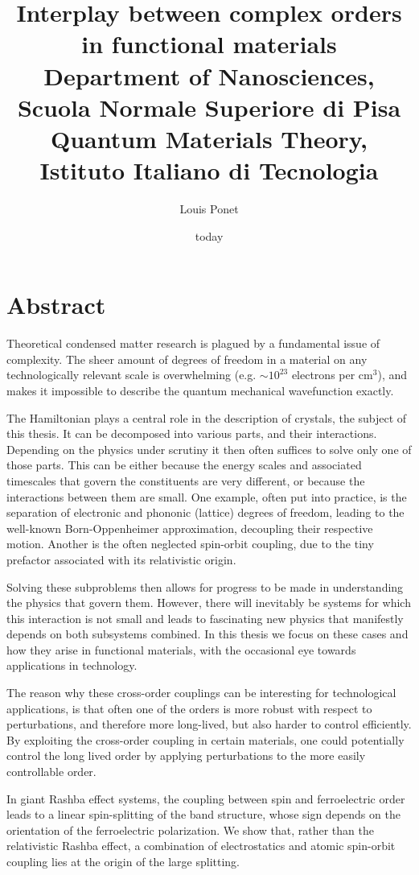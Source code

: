 \documentclass[12pt,a4paper,makeidx]{phdthesis}
\title{
	{Interplay between complex orders in functional materials}\\
	{\large Department of Nanosciences, Scuola Normale Superiore di Pisa}\\
	{\large Quantum Materials Theory, Istituto Italiano di Tecnologia}}
\author{Louis Ponet}
\date{today}
\begin{document}
\chapter*{Abstract}
Theoretical condensed matter research is plagued by a fundamental issue of complexity. The sheer amount of degrees of freedom in a material on any technologically relevant scale is overwhelming (e.g. $\sim10^{23}$ electrons per cm$^3$), and makes it impossible to describe the quantum mechanical wavefunction exactly.

The Hamiltonian plays a central role in the description of crystals, the subject of this thesis. It can be decomposed into various parts, and their interactions. Depending on the physics under scrutiny it then often suffices to solve only one of those parts.
This can be either because the energy scales and associated timescales that govern the constituents are very different, or because the interactions between them are small.
One example, often put into practice, is the separation of electronic and phononic (lattice) degrees of freedom, leading to the well-known Born-Oppenheimer approximation, decoupling their respective motion.
Another is the often neglected spin-orbit coupling, due to the tiny prefactor associated with its relativistic origin.

Solving these subproblems then allows for progress to be made in understanding the physics that govern them.
However, there will inevitably be systems for which this interaction is not small and leads to fascinating new physics that manifestly depends on both subsystems combined.
In this thesis we focus on these cases and how they arise in functional materials, with the occasional eye towards applications in technology.

The reason why these cross-order couplings can be interesting for technological applications, is that often one of the orders is more robust with respect to perturbations, and therefore more long-lived, but also harder to control efficiently.
By exploiting the cross-order coupling in certain materials, one could potentially control the long lived order by applying perturbations to the more easily controllable order.

In giant Rashba effect systems, the coupling between spin and ferroelectric order leads to a linear spin-splitting of the band structure, whose sign depends on the orientation of the ferroelectric polarization.
We show that, rather than the relativistic Rashba effect, a combination of electrostatics and atomic spin-orbit coupling lies at the origin of the large splitting.
\end{document}
